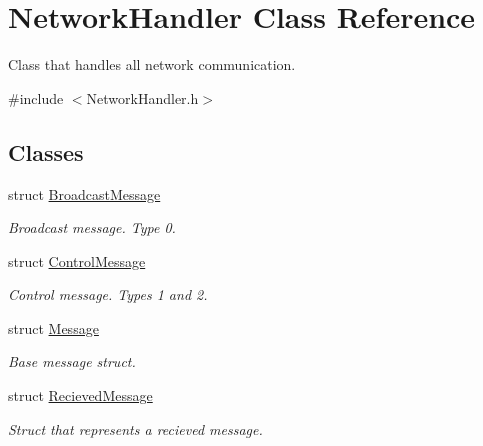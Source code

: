\hypertarget{classNetworkHandler}{}\section{Network\+Handler Class Reference}
\label{classNetworkHandler}


Class that handles all network communication.  




{\ttfamily \#include $<$Network\+Handler.\+h$>$}

\subsection*{Classes}
\begin{DoxyCompactItemize}
\item 
struct \mbox{\hyperlink{structNetworkHandler_1_1BroadcastMessage}{Broadcast\+Message}}
\begin{DoxyCompactList}\small\item\em Broadcast message. Type 0. \end{DoxyCompactList}\item 
struct \mbox{\hyperlink{structNetworkHandler_1_1ControlMessage}{Control\+Message}}
\begin{DoxyCompactList}\small\item\em Control message. Types 1 and 2. \end{DoxyCompactList}\item 
struct \mbox{\hyperlink{structNetworkHandler_1_1Message}{Message}}
\begin{DoxyCompactList}\small\item\em Base message struct. \end{DoxyCompactList}\item 
struct \mbox{\hyperlink{structNetworkHandler_1_1RecievedMessage}{Recieved\+Message}}
\begin{DoxyCompactList}\small\item\em Struct that represents a recieved message. \end{DoxyCompactList}\end{DoxyCompactItemize}
